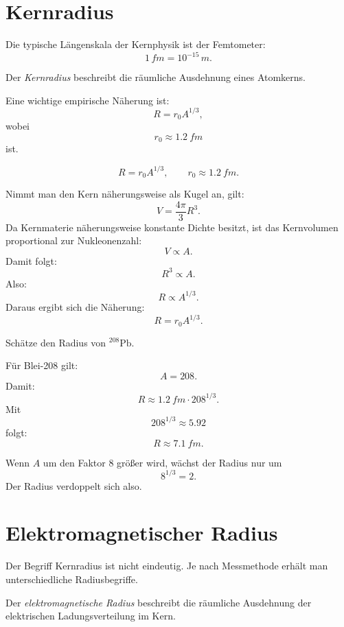 \section{Kernradius}

Die typische Längenskala der Kernphysik ist der Femtometer:
\[
    1\,\si{fm}=10^{-15}\,\si{m}.
\]

\begin{definitionbox}
Der \emph{Kernradius} beschreibt die räumliche Ausdehnung eines Atomkerns.

Eine wichtige empirische Näherung ist:
\[
    R = r_0 A^{1/3},
\]
wobei
\[
    r_0 \approx \SI{1.2}{fm}
\]
ist.
\end{definitionbox}

\begin{formulabox}
\[
    R = r_0 A^{1/3},
    \qquad
    r_0 \approx \SI{1.2}{fm}.
\]
\end{formulabox}

\begin{derivationbox}
Nimmt man den Kern näherungsweise als Kugel an, gilt:
\[
    V = \frac{4\pi}{3}R^3.
\]
Da Kernmaterie näherungsweise konstante Dichte besitzt, ist das Kernvolumen
proportional zur Nukleonenzahl:
\[
    V \propto A.
\]
Damit folgt:
\[
    R^3 \propto A.
\]
Also:
\[
    R \propto A^{1/3}.
\]
Daraus ergibt sich die Näherung:
\[
    R = r_0 A^{1/3}.
\]
\end{derivationbox}

\begin{examplebox}
Schätze den Radius von ${}^{208}\mathrm{Pb}$.

Für Blei-208 gilt:
\[
    A=208.
\]
Damit:
\[
    R \approx \SI{1.2}{fm}\cdot 208^{1/3}.
\]
Mit
\[
    208^{1/3}\approx 5.92
\]
folgt:
\[
    R \approx \SI{7.1}{fm}.
\]
\end{examplebox}

\begin{examtipbox}
Wenn $A$ um den Faktor $8$ größer wird, wächst der Radius nur um
\[
    8^{1/3}=2.
\]
Der Radius verdoppelt sich also.
\end{examtipbox}

\section{Elektromagnetischer Radius}

Der Begriff Kernradius ist nicht eindeutig.
Je nach Messmethode erhält man unterschiedliche Radiusbegriffe.

\begin{definitionbox}
Der \emph{elektromagnetische Radius} beschreibt die räumliche Ausdehnung der
elektrischen Ladungsverteilung im Kern.
\end{definitionbox}

